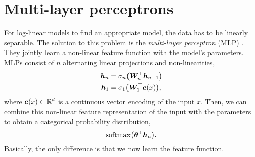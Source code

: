 \section{Multi-layer perceptrons} \label{sec:mlp}

For log-linear models to find an appropriate model, the data has to be linearly
separable. The
solution to this problem is the \textit{multi-layer perceptron}
(MLP) \citep{haykin1994neural}. They jointly learn a non-linear feature function
with the model's parameters. MLPs consist of $n$ alternating linear projections
and non-linearities,
\begin{align*}
  \vec{h}_n &= \sigma_n \lft( \transpose{\mat{W}_n} \vec{h}_{n-1} \rgt) \\
  \bm{h}_1 &= \sigma_1 \lft( \transpose{\mat{W}_1} \vec{e}(x) \rgt)
,\end{align*}
where $\bm{e}(x)\in\mathbb{R}^d$ is a continuous vector encoding of the input $x$.
Then, we can combine this non-linear feature representation of the input with
the parameters to obtain a categorical probability distribution, \[
  \text{softmax} \lft( \transpose{\vec{\theta}} \vec{h}_n \rgt)
.\]
Basically, the only difference is that we now learn the feature function.

